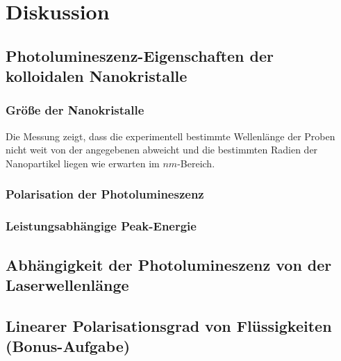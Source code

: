 \section{Diskussion}

\subsection{Photolumineszenz-Eigenschaften der kolloidalen Nanokristalle}

	\subsubsection{ Gr\"{o}{\ss}e der Nanokristalle}
Die Messung zeigt, dass die experimentell bestimmte Wellenl\"{a}nge der Proben nicht weit von der angegebenen abweicht und die bestimmten Radien der Nanopartikel liegen wie erwarten im $nm$-Bereich.

	\subsubsection{Polarisation der Photolumineszenz}

	\subsubsection{Leistungsabh\"{a}ngige Peak-Energie}


\subsection{Abhängigkeit der Photolumineszenz von der Laserwellenlänge}

\subsection{Linearer Polarisationsgrad von Flüssigkeiten (Bonus-Aufgabe)}

